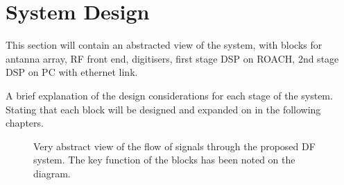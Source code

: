 \chapter{System Design}
\label{ch:system-design}
\graphicspath{{./img/system-design/}}

This section will contain an abstracted view of the system, with blocks for antanna array, RF front end, digitisers, first stage DSP on ROACH, 2nd stage DSP on PC with ethernet link.

A brief explanation of the design considerations for each stage of the system. Stating that each block will be designed and expanded on in the following chapters.

\begin{landscape}
  \thispagestyle{empty}
  \begin{figure}
    \centering
  \caption{Very abstract view of the flow of signals through the proposed DF system. The key function of the blocks has been noted on the diagram. }
  \end{figure}
\end{landscape}

